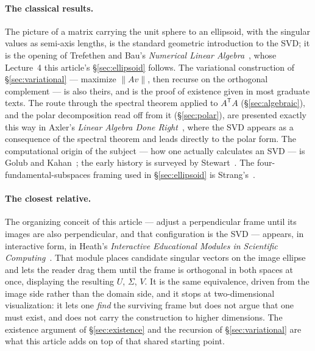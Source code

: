 \documentclass[11pt]{article}
\numberwithin{equation}{section}
\newcommand{\T}{^{\mathsf{T}}}
\theoremstyle{plainish}
\begin{document}
\paragraph{The classical results.} The picture of a matrix carrying the unit
sphere to an ellipsoid, with the singular values as semi-axis lengths, is the
standard geometric introduction to the SVD; it is the opening of Trefethen and
Bau's \emph{Numerical Linear Algebra}~\cite{trefethen1997}, whose Lecture~4 this
article's \S\ref{sec:ellipsoid} follows. The variational construction of
\S\ref{sec:variational} --- maximize $\|Av\|$, then recurse on the orthogonal
complement --- is also theirs, and is the proof of existence given in most
graduate texts. The route through the spectral theorem applied to $A\T A$
(\S\ref{sec:algebraic}), and the polar decomposition read off from it
(\S\ref{sec:polar}), are presented exactly this way in Axler's \emph{Linear
Algebra Done Right}~\cite{axler2024}, where the SVD appears as a consequence of
the spectral theorem and leads directly to the polar form. The computational
origin of the subject --- how one actually calculates an SVD --- is Golub and
Kahan~\cite{golub1965}; the early history is surveyed by
Stewart~\cite{stewart1993}. The four-fundamental-subspaces framing used in
\S\ref{sec:ellipsoid} is Strang's~\cite{strang2019}.

\paragraph{The closest relative.} The organizing conceit of this article ---
adjust a perpendicular frame until its images are also perpendicular, and that
configuration is the SVD --- appears, in interactive form, in Heath's
\emph{Interactive Educational Modules in Scientific
Computing}~\cite{heath2018, heath-iem}. That module places candidate singular
vectors on the image ellipse and lets the reader drag them until the frame is
orthogonal in both spaces at once, displaying the resulting $U$, $\Sigma$, $V$.
It is the same equivalence, driven from the image side rather than the domain
side, and it stops at two-dimensional visualization: it lets one \emph{find} the
surviving frame but does not argue that one must exist, and does not carry the
construction to higher dimensions. The existence argument of \S\ref{sec:existence}
and the recursion of \S\ref{sec:variational} are what this article adds on top of
that shared starting point.
\end{document}
